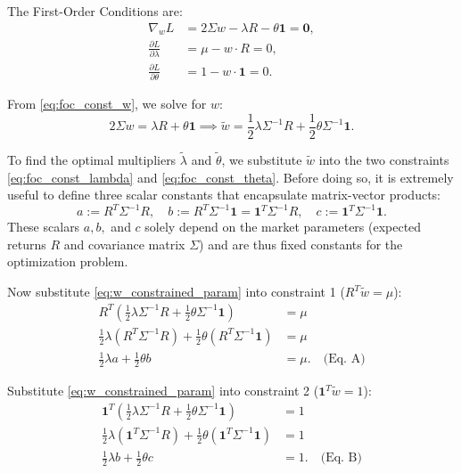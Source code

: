 The First-Order Conditions are:
\begin{align}
    \nabla_w L &= 2\Sigma w - \lambda R - \theta \mathbf{1} = \mathbf{0}, \label{eq:foc_const_w} \\
    \frac{\partial L}{\partial \lambda} &= \mu - w \cdot R = 0, \label{eq:foc_const_lambda} \\
    \frac{\partial L}{\partial \theta} &= 1 - w \cdot \mathbf{1} = 0. \label{eq:foc_const_theta}
\end{align}

From \eqref{eq:foc_const_w}, we solve for $w$:
\begin{equation}
    2\Sigma w = \lambda R + \theta \mathbf{1} \implies \tilde{w} = \frac{1}{2}\lambda \Sigma^{-1} R + \frac{1}{2}\theta \Sigma^{-1} \mathbf{1}. \label{eq:w_constrained_param}
\end{equation}

To find the optimal multipliers $\tilde{\lambda}$ and $\tilde{\theta}$, we substitute $\tilde{w}$ into the two constraints \eqref{eq:foc_const_lambda} and \eqref{eq:foc_const_theta}. Before doing so, it is extremely useful to define three scalar constants that encapsulate matrix-vector products:
\begin{equation}
    a := R^T \Sigma^{-1} R, \quad b := R^T \Sigma^{-1} \mathbf{1} = \mathbf{1}^T \Sigma^{-1} R, \quad c := \mathbf{1}^T \Sigma^{-1} \mathbf{1}.
\end{equation}
These scalars $a, b,$ and $c$ solely depend on the market parameters (expected returns $R$ and covariance matrix $\Sigma$) and are thus fixed constants for the optimization problem.

Now substitute \eqref{eq:w_constrained_param} into constraint 1 ($R^T \tilde{w} = \mu$):
\begin{align*}
    R^T \left( \frac{1}{2}\lambda \Sigma^{-1} R + \frac{1}{2}\theta \Sigma^{-1} \mathbf{1} \right) &= \mu \\
    \frac{1}{2}\lambda (R^T \Sigma^{-1} R) + \frac{1}{2}\theta (R^T \Sigma^{-1} \mathbf{1}) &= \mu \\
    \frac{1}{2}\lambda a + \frac{1}{2}\theta b &= \mu. \quad \text{(Eq. A)}
\end{align*}

Substitute \eqref{eq:w_constrained_param} into constraint 2 ($\mathbf{1}^T \tilde{w} = 1$):
\begin{align*}
    \mathbf{1}^T \left( \frac{1}{2}\lambda \Sigma^{-1} R + \frac{1}{2}\theta \Sigma^{-1} \mathbf{1} \right) &= 1 \\
    \frac{1}{2}\lambda (\mathbf{1}^T \Sigma^{-1} R) + \frac{1}{2}\theta (\mathbf{1}^T \Sigma^{-1} \mathbf{1}) &= 1 \\
    \frac{1}{2}\lambda b + \frac{1}{2}\theta c &= 1. \quad \text{(Eq. B)}
\end{align*}

